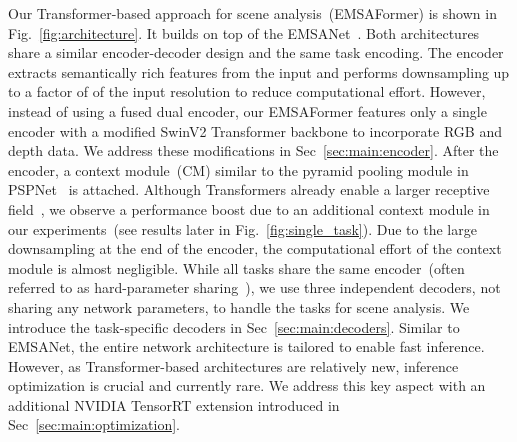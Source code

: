 \documentclass[conference]{IEEEtran}
\begin{document}
Our Transformer-based approach for scene analysis~(EMSAFormer) is shown in Fig.~\ref{fig:architecture}.
It builds on top of the EMSANet~\cite{emsanet2022ijcnn}.
Both architectures share a similar encoder-decoder design and the same task encoding. 
The encoder extracts semantically rich features from the input and performs downsampling up to a factor of  of the input resolution to reduce computational effort.
However, instead of using a fused dual encoder, our EMSAFormer features only a single encoder with a modified SwinV2 Transformer backbone to incorporate RGB and depth data.
We address these modifications in Sec~\ref{sec:main:encoder}.
After the encoder, a context module~(CM) similar to the pyramid pooling module in PSPNet~\cite{PSPNet-cvpr2017} is attached. 
Although Transformers already enable a larger receptive field~\cite{SegFromer-neurips2021}, we observe a performance boost due to an additional context module in our experiments~(see results later in Fig.~\ref{fig:single_task}).
Due to the large downsampling at the end of the encoder, the computational effort of the context module is almost negligible.
While all tasks share the same encoder~(often referred to as hard-parameter sharing~\cite{MTL-survey-tpami-2021}), we use three independent decoders, not sharing any network parameters, to handle the tasks for scene analysis. 
We introduce the task-specific decoders in Sec~\ref{sec:main:decoders}.
Similar to EMSANet, the entire network architecture is tailored to enable fast inference.
However, as Transformer-based architectures are relatively new, inference optimization is crucial and currently rare. 
We address this key aspect with an additional NVIDIA TensorRT extension introduced in Sec~\ref{sec:main:optimization}.
\end{document}
